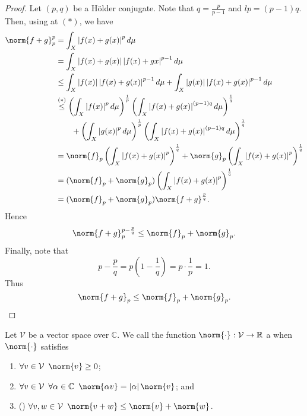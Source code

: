 \documentclass[notoc,notitlepage]{tufte-book}
\begin{document}
\begin{proof}
  Let $(p, q)$ be a Hölder conjugate.
  Note that $q = \frac{p}{p-1}$ and $lp = (p-1)q$.
  Then, using  at $(*)$,
  we have
  \begin{align*}
    \norm{f + g}_p^p 
    &= \int_{X} \abs{f(x) + g(x)}^p \dif{\mu} \\
    &= \int_{X} \abs{f(x) + g(x)} \abs{f(x) + g{x}}^{p-1} \dif{\mu} \\
    &\leq \int_{X} \abs{f(x)} \abs{f(x) + g(x)}^{p-1} \dif{\mu}
      + \int_{X} \abs{g(x)} \abs{f(x) + g(x)}^{p-1} \dif{\mu} \\
    &\overset{(*)}{\leq} \left( \int_{X} \abs{f(x)}^p \dif{\mu} \right)^{\frac{1}{p}}
      \left( \int_{X} \abs{f(x) + g(x)}^{(p-1)q} \dif{\mu} \right)^{\frac{1}{q}} \\
    &\qquad + \left( \int_{X} \abs{g(x)}^p \dif{\mu} \right)^{\frac{1}{p}}
      \left( \int_{X} \abs{f(x) + g(x)}^{(p-1)q} \dif{\mu} \right)^{\frac{1}{q}} \\
    &= \norm{f}_p \left( \int_{X} \abs{f(x) + g(x)}^p \right)^{\frac{1}{q}}
      + \norm{g}_p \left( \int_{X} \abs{f(x) + g(x)}^{p} \right)^{\frac{1}{q}} \\
    &= ( \norm{f}_p + \norm{g}_p )
      \left( \int_{X} \abs{f(x) + g(x)}^{p} \right)^{\frac{1}{q}} \\
    &= ( \norm{f}_p + \norm{g}_p ) \norm{f + g}^{\frac{p}{q}}.
  \end{align*}
  Hence
  \begin{equation*}
    \norm{f + g}_p^{p - \frac{p}{q}} \leq \norm{f}_p + \norm{g}_p.
  \end{equation*}
  Finally, note that
  \begin{equation*}
    p - \frac{p}{q} = p \left( 1 - \frac{1}{q} \right) = p \cdot \frac{1}{p} = 1.
  \end{equation*}
  Thus
  \begin{equation*}
    \norm{f + g}_p \leq \norm{f}_p + \norm{g}_p.
  \end{equation*}
\end{proof}

\begin{defn}\label{defn:semi_norm}
  Let $\mathcal{V}$ be a vector space over $\mathbb{C}$.
  We call the function $\norm{\cdot} : \mathcal{V} \to \mathbb{R}$
  a  when $\norm{\cdot}$ satisfies
  \begin{enumerate}
    \item $\forall v \in \mathcal{V} \enspace \norm{v} \geq 0$;
    \item $\forall v \in \mathcal{V} \enspace \forall \alpha \in \mathbb{C} \enspace
      \norm{\alpha v} = \abs{\alpha} \norm{v}$; and
    \item () $\forall v, w \in \mathcal{V} \enspace
      \norm{v + w} \leq \norm{v} + \norm{w}$.
  \end{enumerate}
\end{defn}
\end{document}
